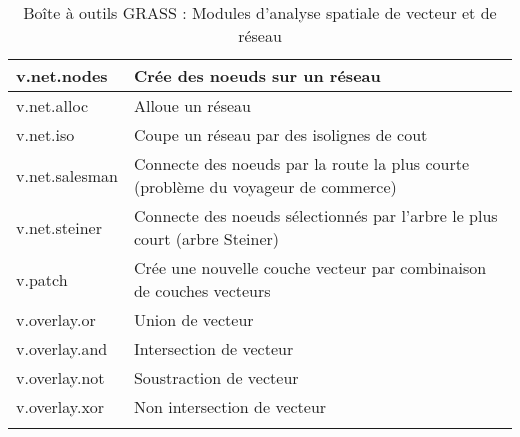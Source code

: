 \begin{center}
{\begin{longtable}{|p{2.5cm}|p{11.5cm}|}
  \hline v.net.nodes & Crée des noeuds sur un réseau\\
  \hline v.net.alloc & Alloue un réseau\\
  \hline v.net.iso & Coupe un réseau par des isolignes de cout\\
  \hline v.net.salesman & Connecte des noeuds par la route la plus courte (problème du voyageur de commerce) \\
  \hline v.net.steiner & Connecte des noeuds sélectionnés par l'arbre le plus court (arbre Steiner) \\
  \hline v.patch & Crée une nouvelle couche vecteur par combinaison de couches vecteurs\\
  \hline v.overlay.or & Union de vecteur\\
  \hline v.overlay.and & Intersection de vecteur\\
  \hline v.overlay.not & Soustraction de vecteur \\
  \hline v.overlay.xor & Non intersection de vecteur\\
\hline
\caption{Boîte à outils GRASS : Modules d'analyse spatiale de vecteur et de réseau}
\end{longtable}}
\end{center} 

